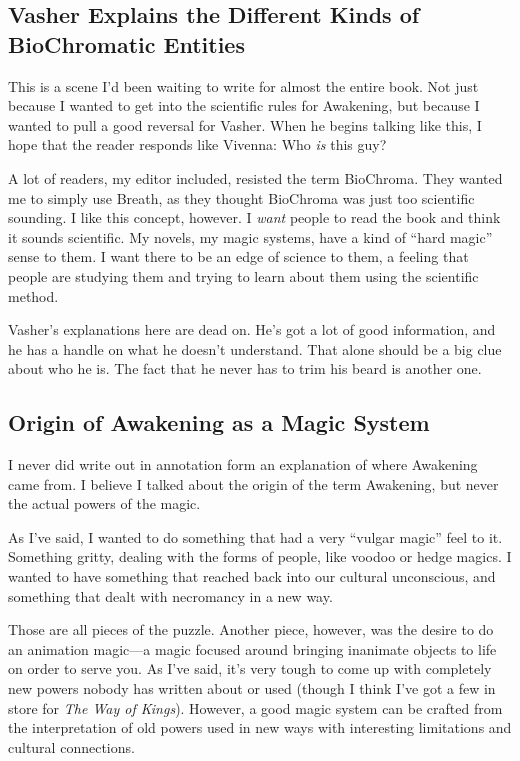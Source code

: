 \subsection*{Vasher Explains the Different Kinds of BioChromatic Entities}

This is a scene I’d been waiting to write for almost the entire book. Not just because I wanted to get into the scientific rules for Awakening, but because I wanted to pull a good reversal for Vasher. When he begins talking like this, I hope that the reader responds like Vivenna: Who \textit{is} this guy?

A lot of readers, my editor included, resisted the term BioChroma. They wanted me to simply use Breath, as they thought BioChroma was just too scientific sounding. I like this concept, however. I \textit{want} people to read the book and think it sounds scientific. My novels, my magic systems, have a kind of “hard magic” sense to them. I want there to be an edge of science to them, a feeling that people are studying them and trying to learn about them using the scientific method.

Vasher’s explanations here are dead on. He’s got a lot of good information, and he has a handle on what he doesn’t understand. That alone should be a big clue about who he is. The fact that he never has to trim his beard is another one.

\subsection*{Origin of Awakening as a Magic System}

I never did write out in annotation form an explanation of where Awakening came from. I believe I talked about the origin of the term Awakening, but never the actual powers of the magic.

As I’ve said, I wanted to do something that had a very “vulgar magic” feel to it. Something gritty, dealing with the forms of people, like voodoo or hedge magics. I wanted to have something that reached back into our cultural unconscious, and something that dealt with necromancy in a new way.

Those are all pieces of the puzzle. Another piece, however, was the desire to do an animation magic—a magic focused around bringing inanimate objects to life on order to serve you. As I’ve said, it’s very tough to come up with completely new powers nobody has written about or used (though I think I’ve got a few in store for \textit{The Way of Kings}). However, a good magic system can be crafted from the interpretation of old powers used in new ways with interesting limitations and cultural connections.

